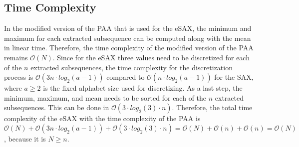 \subsection*{Time Complexity}
In the modified version of the  \ac{PAA} that is used for the \ac{eSAX}, the minimum and maximum for each extracted subsequence can be computed along with the mean in linear time. Therefore, the time complexity of the modified version of the \ac{PAA} remains $\mathcal{O}(N)$. \newline
Since for the \ac{eSAX} three values need to be discretized for each of the $n$ extracted subsequences, the time complexity for the discretization process is $\mathcal{O}(3n \cdot log_{2}(a-1))$ compared to $\mathcal{O}(n \cdot log_{2}(a-1))$ for the \ac{SAX}, where $a \geq 2$ is the fixed alphabet size used for discretizing. \newline
As a last step, the minimum, maximum, and mean needs to be sorted for each of the $n$ extracted subsequences. This can be done in $\mathcal{O}(3 \cdot log_{2}(3) \cdot n)$. \newline
Therefore, the total time complexity of the \ac{eSAX} with the time complexity of the \ac{PAA} is $\mathcal{O}(N) + \mathcal{O}(3n \cdot log_{2}(a-1)) + \mathcal{O}(3 \cdot log_{2}(3) \cdot n) = \mathcal{O}(N) + \mathcal{O}(n) + \mathcal{O}(n) = \mathcal{O}(N)$, because it is $N \geq n$.